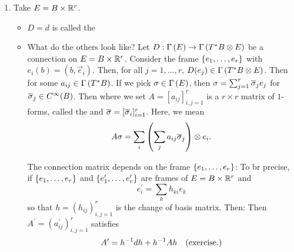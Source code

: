 \documentclass[main.tex]{subfiles}
\begin{document}
\begin{exmp}
    \begin{enumerate}
        \item Take $E = B \times \mathbb{R}^r$.
            \begin{itemize}
                \item $D = d$ is called the 
                \item What do the others look like? Let $D : \Gamma\left( E \right) \to \Gamma\left( T^*B \otimes E \right)$ be a connection on $E =B \times \mathbb{R}^r$. Consider the frame $\left\{e_1, \dots, e_r\right\}$ with $e_i(b) = (b, \vec{e}_i)$. Then, for all $j = 1,\dots, r$, $D(e_j) \in \Gamma\left( T^*B \otimes E \right)$. Then
                 for some $a_{ij} \in \Gamma\left( T^*B \right)$. If we pick $\sigma \in \Gamma\left( E \right)$, then $\sigma = \sum_{j=1}^r \overline{\sigma}_j e_j$ for $\overline{\sigma}_j \in C^\infty(B)$. Then
                 where we set $A = [a_{ij}]_{i,j=1}^r$ is a $r \times r$ matrix of $1$-forms, called the  and $\overline{\sigma} = [\overline{\sigma}_i]_{i=1}^r$. Here, we mean
                \[
                A\sigma = \sum_i \left(  \sum_j a_{ij} \overline{\sigma}_j  \right) \otimes e_i.
                \]

                \begin{note}
                The connection matrix depends on the frame $\left\{e_1, \dots, e_r\right\}$: To br precise, if $\left\{e_1, \dots, e_r\right\}$ and $\left\{e_1^\prime, \dots, e_r^\prime\right\}$ are frames of $E = B \times \mathbb{R}^r$ and
                \[
                e_i^\prime = \sum_k h_{ki} e_k
                \]
                so that $h = (h_{ij})_{i,j=1}^r$ is the change of basis matrix. Then:
                Then $A^\prime = (a_{ij}^\prime)_{i,j=1}^r$ satisfies
                \[
                A^\prime = h^{-1}dh + h^{-1}A h \hspace{1em}\text{(exercise.)}
                \]
                \end{note}
            \end{itemize}


\end{enumerate}
\end{exmp}
\end{document}
